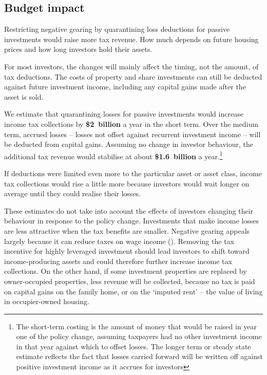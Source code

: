 \subsection{Budget impact}
Restricting negative gearing by quarantining loss deductions for passive investments would raise more tax revenue. How much depends on future housing prices and how long investors hold their assets.

For most investors, the changes will mainly affect the timing, not the amount, of tax deductions. The costs of property and share investments can still be deducted against future investment income, including any capital gains made after the asset is sold.

We estimate that quarantining losses for passive investments would increase income tax collections by \textbf{\$2~billion} a year in the short term. Over the medium term, accrued losses – losses not offset against recurrent investment income – will be deducted from capital gains. Assuming no change in investor behaviour, the additional tax revenue would stabilise at about \textbf{\$1.6~billion} a year.\footnote{The short-term costing is the amount of money that would be raised in year one of the policy change, assuming taxpayers had no other investment income in that year against which to offset losses. The longer term or steady state estimate reflects the fact that losses carried forward will be written off against positive investment income as it accrues for investors} 

If deductions were limited even more to the particular asset or asset class, income tax collections would rise a little more because investors would wait longer on average until they could realise their losses. 

These estimates do not take into account the effects of investors changing their behaviour in response to the policy change. Investments that make income losses are less attractive when the tax benefits are smaller. Negative gearing appeals largely because it can reduce taxes on wage income (). Removing the tax incentive for highly leveraged investment should lead investors to shift toward income-producing assets and could therefore further increase income tax collections. On the other hand, if some investment properties are replaced by owner-occupied properties, less revenue will be collected, because no tax is paid on capital gains on the family home, or on the ‘imputed rent’ – the value of living in occupier-owned housing.

